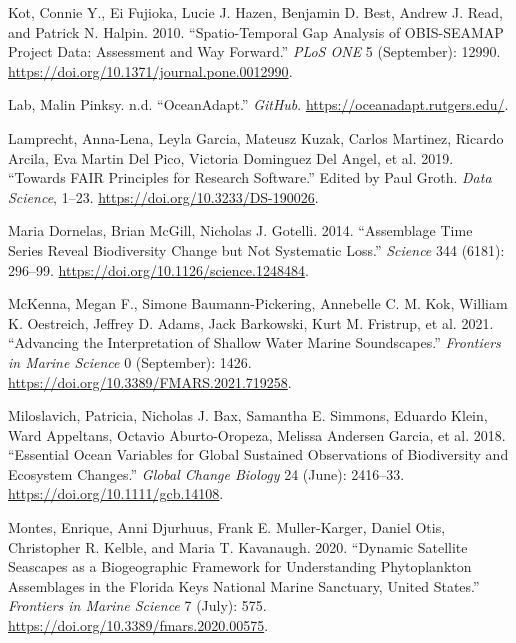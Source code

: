 \documentclass[
]{book}
\newlength{\cslhangindent}
\newlength{\cslentryspacingunit} %
\newenvironment{CSLReferences}[2] %
 {%
  \setlength{\parindent}{0pt}
  \ifodd #1
  \let\oldpar\par
  \def\par{\hangindent=\cslhangindent\oldpar}
  \fi
  \setlength{\parskip}{#2\cslentryspacingunit}
 }%
 {}
\begin{document}
\begin{CSLReferences}{1}{0}
\leavevmode{}%
Kot, Connie Y., Ei Fujioka, Lucie J. Hazen, Benjamin D. Best, Andrew J. Read, and Patrick N. Halpin. 2010. {``Spatio-Temporal Gap Analysis of OBIS-SEAMAP Project Data: Assessment and Way Forward.''} \emph{PLoS ONE} 5 (September): 12990. \url{https://doi.org/10.1371/journal.pone.0012990}.

\leavevmode{}%
Lab, Malin Pinksy. n.d. {``OceanAdapt.''} \emph{GitHub}. \url{https://oceanadapt.rutgers.edu/}.

\leavevmode{}%
Lamprecht, Anna-Lena, Leyla Garcia, Mateusz Kuzak, Carlos Martinez, Ricardo Arcila, Eva Martin Del Pico, Victoria Dominguez Del Angel, et al. 2019. {``Towards FAIR Principles for Research Software.''} Edited by Paul Groth. \emph{Data Science}, 1--23. \url{https://doi.org/10.3233/DS-190026}.

\leavevmode{}%
Maria Dornelas, Brian McGill, Nicholas J. Gotelli. 2014. {``Assemblage Time Series Reveal Biodiversity Change but Not Systematic Loss.''} \emph{Science} 344 (6181): 296--99. \url{https://doi.org/10.1126/science.1248484}.

\leavevmode{}%
McKenna, Megan F., Simone Baumann-Pickering, Annebelle C. M. Kok, William K. Oestreich, Jeffrey D. Adams, Jack Barkowski, Kurt M. Fristrup, et al. 2021. {``Advancing the Interpretation of Shallow Water Marine Soundscapes.''} \emph{Frontiers in Marine Science} 0 (September): 1426. \url{https://doi.org/10.3389/FMARS.2021.719258}.

\leavevmode{}%
Miloslavich, Patricia, Nicholas J. Bax, Samantha E. Simmons, Eduardo Klein, Ward Appeltans, Octavio Aburto-Oropeza, Melissa Andersen Garcia, et al. 2018. {``Essential Ocean Variables for Global Sustained Observations of Biodiversity and Ecosystem Changes.''} \emph{Global Change Biology} 24 (June): 2416--33. \url{https://doi.org/10.1111/gcb.14108}.

\leavevmode{}%
Montes, Enrique, Anni Djurhuus, Frank E. Muller-Karger, Daniel Otis, Christopher R. Kelble, and Maria T. Kavanaugh. 2020. {``Dynamic Satellite Seascapes as a Biogeographic Framework for Understanding Phytoplankton Assemblages in the Florida Keys National Marine Sanctuary, United States.''} \emph{Frontiers in Marine Science} 7 (July): 575. \url{https://doi.org/10.3389/fmars.2020.00575}.


\end{CSLReferences}
\end{document}
